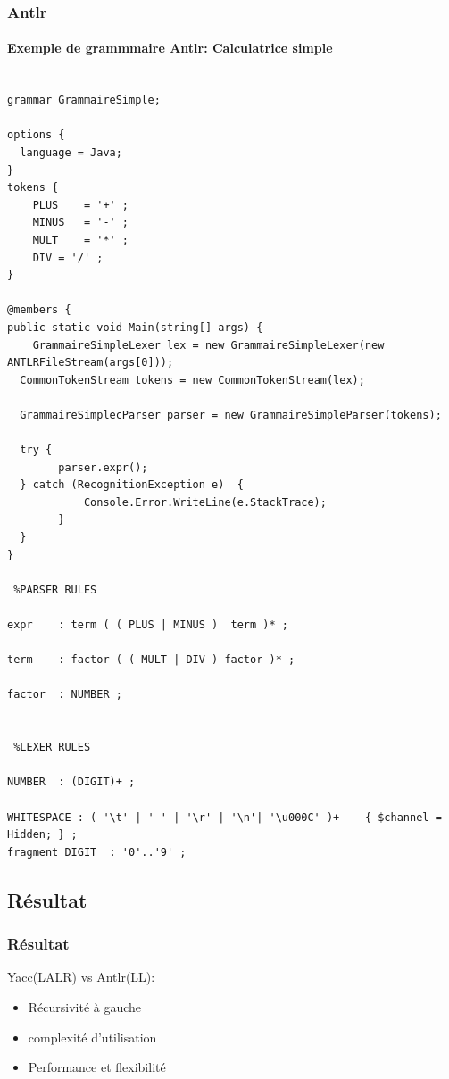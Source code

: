 \documentclass{beamer}
\begin{document}
\begin{frame}[fragile,allowframebreaks=0.98]\frametitle{Antlr}\framesubtitle{Exemple de grammmaire Antlr: Calculatrice simple}

\begin{Verbatim}[fontsize=\scriptsize,frame=lines]

grammar GrammaireSimple;

options {
  language = Java;
}
tokens {
    PLUS    = '+' ;
    MINUS   = '-' ;
    MULT    = '*' ;
    DIV = '/' ;
}
 
@members {
public static void Main(string[] args) {
	GrammaireSimpleLexer lex = new GrammaireSimpleLexer(new ANTLRFileStream(args[0]));
  CommonTokenStream tokens = new CommonTokenStream(lex);
 
  GrammaireSimplecParser parser = new GrammaireSimpleParser(tokens);
 
  try {
		parser.expr();
  } catch (RecognitionException e)  {
			Console.Error.WriteLine(e.StackTrace);
		}
  }
}
 
 %PARSER RULES
 
expr    : term ( ( PLUS | MINUS )  term )* ;
 
term    : factor ( ( MULT | DIV ) factor )* ;
 
factor  : NUMBER ;
 
 
 %LEXER RULES
 
NUMBER  : (DIGIT)+ ;
 
WHITESPACE : ( '\t' | ' ' | '\r' | '\n'| '\u000C' )+    { $channel = Hidden; } ; 
fragment DIGIT  : '0'..'9' ;

\end{Verbatim}


\end{frame}



\subsection{Résultat}

\begin{frame}\frametitle{Résultat}

	Yacc(LALR) vs Antlr(LL):
	\begin{itemize}
				\item Récursivité à gauche\newline
				\item complexité d'utilisation\newline
				\item Performance et flexibilité\newline
	\end{itemize}

\end{frame}
\end{document}
